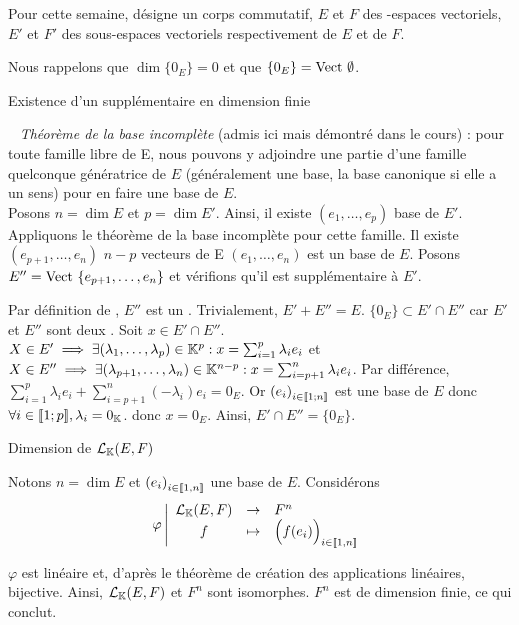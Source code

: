 \documentclass{article}
\renewenvironment{question_kholle}[2][ ]
{
	\subsection{\texorpdfstring{#2}{}}
	\notblank{#1}
	{
		\noindent #1
		\bigbreak
	}
	{}
	\begin{proof}
}
{
	\end{proof}
}
\begin{document}
	Pour cette semaine, \K désigne un corps commutatif, $E$ et $F$ des \K\!\!-espaces vectoriels, $E'$ et $F'$ des sous-espaces vectoriels respectivement de $E$ et de $F$.
	
	Nous rappelons que $\dim \{0_E\} = 0$ et que $\{0_E\} = \text{Vect } \emptyset$.
	
	\begin{question_kholle}
		{Existence d'un supplémentaire en dimension finie}
		
		~\newline
		\textit{Théorème de la base incomplète} (admis ici mais démontré dans le cours) : pour toute famille libre de E, nous pouvons y adjoindre une partie d'une famille quelconque génératrice de $E$ (généralement une base, la base canonique si elle a un sens) pour en faire une base de $E$. \\
		
		Posons $n = \dim E$ et $p = \dim E'$. Ainsi, il existe $(e_1, \ldots, e_p)$ base de $E'$.
		Appliquons le théorème de la base incomplète pour cette famille.
		Il existe $(e_{p+1}, \ldots, e_n)$ $n-p$ vecteurs de E \tq $(e_1, \ldots, e_n)$ est un base de $E$.
		Posons $E'' = \text{Vect } \{ e_{p+1}, \ldots, e_n \}$ et vérifions qu'il est supplémentaire à $E'$.
		
		Par définition de \Vect\!\!, $E''$ est un \sev.
		Trivialement, $E' + E'' = E$.
		$\{0_E\} \subset E' \cap E''$ car $E'$ et $E''$ sont deux \sevs.
		Soit $x \in E' \cap E''$.
		$X \in E' \implies \exists (\lambda_1, \ldots, \lambda_p) \in \mathbb K^p : x = \sum_{i=1}^{p} \lambda_i e_i$ et 
		$X \in E'' \implies \exists (\lambda_{p+1}, \ldots, \lambda_n) \in \mathbb K^{n-p} : x = \sum_{i=p+1}^{n} \lambda_i e_i$.
		Par différence, $\sum_{i=1}^{p} \lambda_i e_i + \sum_{i=p+1}^{n} \left(-\lambda_i\right) e_i = 0_E$.
		Or $\left(e_i\right)_{i \in [\![ 1 ; n ]\!]}$ est une base de $E$ donc $\forall i \in [\![ 1 ; p ]\!], \lambda_i = 0_{\mathbb K}$.
		donc $x = 0_E$.
		Ainsi, $E' \cap E'' = \{0_E\}$.
	\end{question_kholle}
	
	\begin{question_kholle}
		[$\mathcal{L}_\K(E,F)$ est dimension finie et
		\begin{equation}
			\dim \mathcal{L}_\K(E,F) = \dim E \times \dim F
		\end{equation}]
		{Dimension de $\mathcal{L}_\K(E,F)$}
		
		Notons $n = \dim E$ et $\left(e_i\right)_{i \in [\![ 1 , n ]\!]}$ une base de $E$. Considérons
		\begin{equation*}
			\varphi
			\left| \begin{array}{ccl}
				\mathcal{L}_{\mathbb K}(E,F) &\to &F^n \\
				f &\mapsto &\Big( f(e_i) \Big)_{i \in [\![ 1 , n ]\!]}
			\end{array} \right.
		\end{equation*}
		
		$\varphi$ est linéaire et, d'après le théorème de création des applications linéaires, bijective.
		Ainsi, $\mathcal{L}_\K(E,F)$ et $F^n$ sont isomorphes. $F^n$ est de dimension finie, ce qui conclut.
	\end{question_kholle}
	
\end{document}
